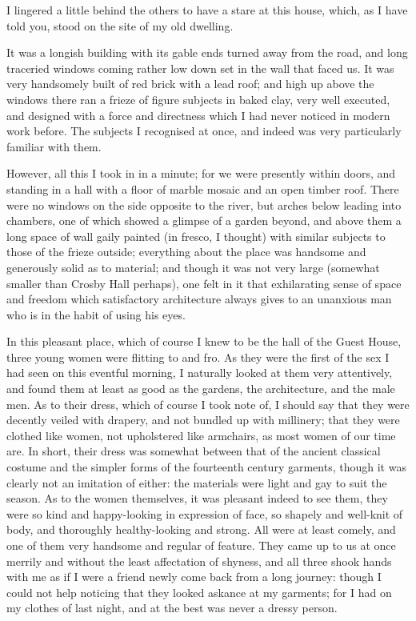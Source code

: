 I lingered a little behind the others to have a stare at this house,
which, as I have told you, stood on the site of my old dwelling.

It was a longish building with its gable ends turned away from the road,
and long traceried windows coming rather low down set in the wall that
faced us. It was very handsomely built of red brick with a lead roof;
and high up above the windows there ran a frieze of figure subjects in
baked clay, very well executed, and designed with a force and directness
which I had never noticed in modern work before. The subjects I
recognised at once, and indeed was very particularly familiar with them.

However, all this I took in in a minute; for we were presently within
doors, and standing in a hall with a floor of marble mosaic and an open
timber roof. There were no windows on the side opposite to the river,
but arches below leading into chambers, one of which showed a glimpse of
a garden beyond, and above them a long space of wall gaily painted (in
fresco, I thought) with similar subjects to those of the frieze outside;
everything about the place was handsome and generously solid as to
material; and though it was not very large (somewhat smaller than Crosby
Hall perhaps), one felt in it that exhilarating sense of space and
freedom which satisfactory architecture always gives to an unanxious man
who is in the habit of using his eyes.

In this pleasant place, which of course I knew to be the hall of the
Guest House, three young women were flitting to and fro. As they were
the first of the sex I had seen on this eventful morning, I naturally
looked at them very attentively, and found them at least as good as the
gardens, the architecture, and the male men. As to their dress, which of
course I took note of, I should say that they were decently veiled with
drapery, and not bundled up with millinery; that they were clothed like
women, not upholstered like armchairs, as most women of our time are. In
short, their dress was somewhat between that of the ancient classical
costume and the simpler forms of the fourteenth century garments, though
it was clearly not an imitation of either: the materials were light and
gay to suit the season. As to the women themselves, it was pleasant
indeed to see them, they were so kind and happy-looking in expression of
face, so shapely and well-knit of body, and thoroughly healthy-looking
and strong. All were at least comely, and one of them very handsome and
regular of feature. They came up to us at once merrily and without the
least affectation of shyness, and all three shook hands with me as if I
were a friend newly come back from a long journey: though I could not
help noticing that they looked askance at my garments; for I had on my
clothes of last night, and at the best was never a dressy person.

